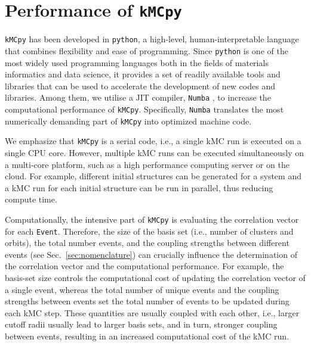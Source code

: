 \documentclass[a4paper,fleqn]{cas-dc}
\begin{document}
{\section{Performance of \texttt{kMCpy}}\label{sec:performance}
\noindent \texttt{kMCpy} has been developed in \texttt{python}, a high-level, human-interpretable language that combines flexibility and ease of programming. Since \texttt{python} is one of the most widely used programming languages\cite{perez_python_2011,noauthor_top_2022} both in the fields of materials informatics and data science, it provides a set of readily available tools and libraries that can be used to accelerate the development of new codes and libraries. Among them, we utilise a JIT compiler, \texttt{Numba} \cite{lam_numba_2015}, to increase the computational performance of \texttt{kMCpy}. Specifically, \texttt{Numba} translates the most numerically demanding part of \texttt{kMCpy} into optimized machine code. 

We emphasize that \texttt{kMCpy} is a serial code, i.e., a single kMC run is executed on a single CPU core. However, multiple kMC runs can be executed simultaneously on a multi-core platform, such as a high performance computing server or on the cloud. For example, different initial structures can be generated for a system and a kMC run for each initial structure can be run in parallel, thus reducing compute time.

Computationally, the intensive part of \texttt{kMCpy} is evaluating the correlation vector for each \texttt{Event}. Therefore, the size of the basis set (i.e., number of clusters and orbits), the total number events, and the coupling strengths between different events (see Sec.~\ref{sec:nomenclature}) can crucially influence the determination of the  correlation vector  and the computational performance. For example, the basis-set size controls the computational cost of updating the correlation vector of a single event, whereas the total number of unique events and the coupling strengths between events set the total number of events to be updated during each kMC step. These quantities are usually coupled with each other, i.e., larger cutoff radii usually lead to larger basis sets, and in turn, stronger coupling between events, resulting in an increased computational cost of the kMC run.

}
\end{document}
